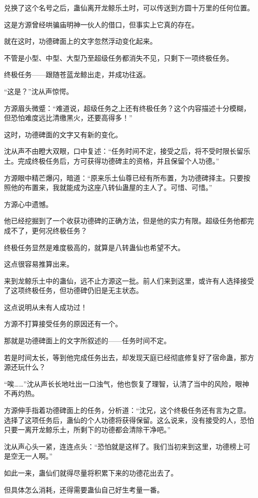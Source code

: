 \begin{this_body}
兑换了这个名号之后，蛊仙离开龙鲸乐土时，可以传送到方圆十万里的任何位置。

这是方源曾经哄骗庙明神一伙人的借口，但事实上它真的存在。

就在这时，功德碑面上的文字忽然浮动变化起来。

不管是小型、中型、大型乃至超级任务都消失不见，只剩下一项终极任务。

终极任务——跟随苍蓝龙鲸出走，并成功往返。

“这是？”沈从声惊愕。

方源眉头微蹙：“难道说，超级任务之上还有终极任务？这个内容描述十分模糊，但恐怕难度远比清缴黑火，还要高得多！”

这时，功德碑面的文字又有新的变化。

沈从声不由瞪大双眼，口中复述：“任务时间不定，接受之后，将不受时限长留乐土。完成终极任务后，方可获得功德碑主的资格，并且保留个人功德。”

方源眼中精芒爆闪，暗道：“原来乐土仙尊已经有所布置，为功德碑择主。只要按照他的布置来，我就能成为这座八转仙蛊屋的主人了。可惜、可惜。”

方源心中遗憾。

他已经挖掘到了一个收获功德碑的正确方法，但是他的实力有限。超级任务他都完成不了，更何况终极任务？

终极任务显然是难度极高的，就算是八转蛊仙也希望不大。

这点很容易推算出来。

来到龙鲸乐土中的蛊仙，远不止方源这一批。前人们来到这里，或许有人选择接受了这项终极任务，但功德碑仍旧是无主状态。

这点说明从未有人成功过！

方源不打算接受任务的原因还有一个。

那就是功德碑面上的文字所叙述的——任务时间不定。

若是时间太长，等到他完成任务出去，却发现天庭已经彻底修复好了宿命蛊，那方源还玩什么？

“唉……”沈从声长长地吐出一口浊气，他也恢复了理智，认清了当中的风险，眼神不再灼热。

方源伸手指着功德碑面上的任务，分析道：“沈兄，这个终极任务还有言为之意。选择了这项任务后，蛊仙的个人功德将获得保留。这么说来，没有接受的人，恐怕只要一离开龙鲸乐土，所剩下的功德都会清除干净吧。”

沈从声心头一紧，连连点头：“恐怕就是这样了。我们当初来到这里，功德榜上可是空无一人啊。”

如此一来，蛊仙们就得尽量将积累下来的功德花出去了。

但具体怎么消耗，还得需要蛊仙自己好生考量一番。


\end{this_body}
